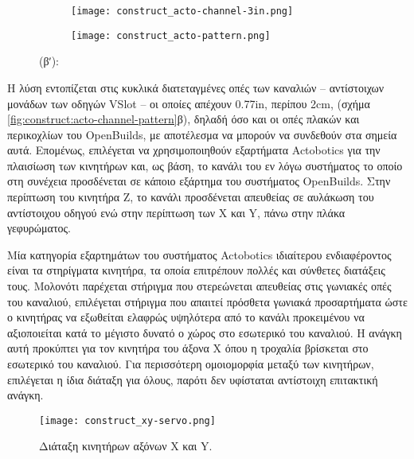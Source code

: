 \begin{figure}
    \caption{Κανάλι Actobotics και διάταξη οπών.
        \label{fig:construct:acto-channel-pattern}}
    \begin{center}
        \begin{subfigure}[b]{0.40\textwidth}
            \texttt{[image: construct\_acto-channel-3in.png]}
            \caption{}
        \end{subfigure}
        \begin{subfigure}[b]{0.35\textwidth}
            \texttt{[image: construct\_acto-pattern.png]}
            \caption{}
        \end{subfigure}
    \end{center}

    (βʹ): 
\end{figure}

Η λύση εντοπίζεται στις κυκλικά διατεταγμένες οπές των καναλιών -- αντίστοιχων
μονάδων των οδηγών VSlot -- οι οποίες απέχουν 0.77in, περίπου 2cm, (σχήμα
\ref{fig:construct:acto-channel-pattern}β), δηλαδή όσο και οι οπές πλακών και
περικοχλίων του OpenBuilds, με αποτέλεσμα να μπορούν να συνδεθούν στα σημεία
αυτά.
Επομένως, επιλέγεται να χρησιμοποιηθούν εξαρτήματα Actobotics για την πλαισίωση
των κινητήρων και, ως βάση, το κανάλι του εν λόγω συστήματος το οποίο στη
συνέχεια προσδένεται σε κάποιο εξάρτημα του συστήματος OpenBuilds. Στην
περίπτωση του κινητήρα Z, το κανάλι προσδένεται απευθείας σε αυλάκωση του 
αντίστοιχου οδηγού ενώ στην περίπτωση των X και Y, πάνω στην πλάκα γεφυρώματος.

Μία κατηγορία εξαρτημάτων του συστήματος Actobotics ιδιαίτερου ενδιαφέροντος
είναι τα στηρίγματα κινητήρα, τα οποία επιτρέπουν πολλές και σύνθετες διατάξεις
τους. Μολονότι παρέχεται στήριγμα που στερεώνεται απευθείας στις γωνιακές οπές
του καναλιού, επιλέγεται στήριγμα που απαιτεί πρόσθετα γωνιακά προσαρτήματα ώστε
ο κινητήρας να εξωθείται ελαφρώς υψηλότερα από το κανάλι προκειμένου να
αξιοποιείται κατά το μέγιστο δυνατό ο χώρος στο εσωτερικό του καναλιού.
Η ανάγκη αυτή προκύπτει για τον κινητήρα του άξονα X όπου η τροχαλία βρίσκεται
στο εσωτερικό του καναλιού. Για περισσότερη ομοιομορφία μεταξύ των κινητήρων,
επιλέγεται η ίδια διάταξη για όλους, παρότι δεν υφίσταται αντίστοιχη επιτακτική
ανάγκη.

\begin{figure}
    \caption{Διάταξη κινητήρων αξόνων X και Y.\label{fig:construct:xy-servo}}
    \begin{center}%
    \def\svgwidth{0.5\textwidth}
%    
    \texttt{[image: construct\_xy-servo.png]}
    \end{center}
\end{figure}
%

